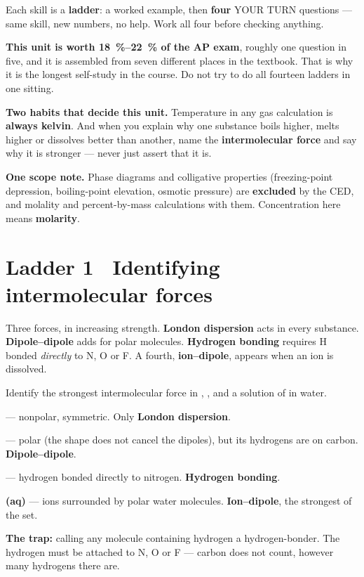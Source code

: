 \documentclass{apchem-worksheet}
\begin{document}
\apctitleblock

\begin{apcnote}
Each skill is a \textbf{ladder}: a worked example, then \textbf{four}
YOUR TURN questions --- same skill, new numbers, no help. Work all four
before checking anything.

\textbf{This unit is worth \SI{18}{\percent}--\SI{22}{\percent} of the AP
exam}, roughly one question in five, and it is assembled from seven
different places in the textbook. That is why it is the longest self-study
in the course. Do not try to do all fourteen ladders in one sitting.

\textbf{Two habits that decide this unit.} Temperature in any gas
calculation is \textbf{always kelvin}. And when you explain why one
substance boils higher, melts higher or dissolves better than another,
name the \textbf{intermolecular force} and say why it is stronger --- never
just assert that it is.

\textbf{One scope note.} Phase diagrams and colligative properties
(freezing-point depression, boiling-point elevation, osmotic pressure) are
\textbf{excluded} by the CED, and molality and percent-by-mass
calculations with them. Concentration here means \textbf{molarity}.
\end{apcnote}

\section*{\sffamily Ladder 1 \textbullet\ Identifying intermolecular forces}

Three forces, in increasing strength. \textbf{London dispersion} acts in
every substance. \textbf{Dipole--dipole} adds for polar molecules.
\textbf{Hydrogen bonding} requires H bonded \emph{directly} to N, O or F.
A fourth, \textbf{ion--dipole}, appears when an ion is dissolved.

\begin{workedexample}
Identify the strongest intermolecular force in , ,
 and a solution of  in water.

\textbf{} --- nonpolar, symmetric. Only \textbf{London
dispersion}.

\textbf{} --- polar (the shape does not cancel the 
dipoles), but its hydrogens are on carbon. \textbf{Dipole--dipole}.

\textbf{} --- hydrogen bonded directly to nitrogen.
\textbf{Hydrogen bonding}.

\textbf{(aq)} --- ions surrounded by polar water molecules.
\textbf{Ion--dipole}, the strongest of the set.

\textbf{The trap:} calling any molecule containing hydrogen a
hydrogen-bonder. The hydrogen must be attached to N, O or F --- carbon does
not count, however many hydrogens there are.
\end{workedexample}
\end{document}
